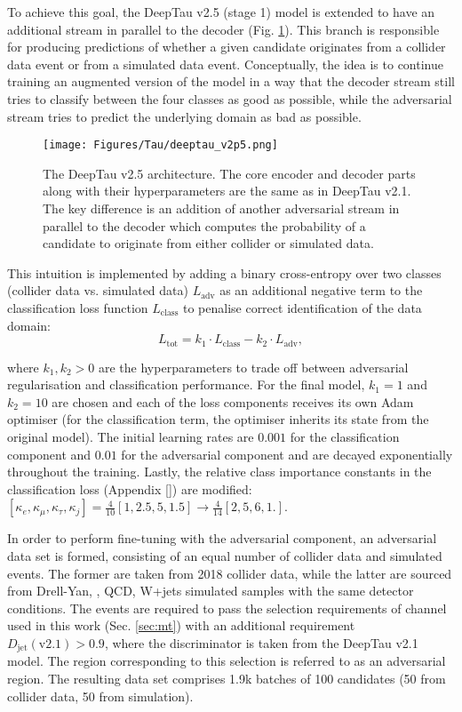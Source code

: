 To achieve this goal, the DeepTau v2.5 (stage 1) model is extended to have an additional stream in parallel to the decoder (Fig. \ref{fig:deeptau_v2p5_arch}). This branch is responsible for producing predictions of whether a given \tauh candidate originates from a collider data event or from a simulated data event. Conceptually, the idea is to continue training an augmented version of the model in a way that the decoder stream still tries to classify between the four classes as good as possible, while the adversarial stream tries to predict the underlying \tauh domain as bad as possible. 

\begin{figure}[!t]
    \centering
    \texttt{[image: Figures/Tau/deeptau\_v2p5.png]}
    \caption{The DeepTau v2.5 architecture. The core encoder and decoder parts along with their hyperparameters are the same as in DeepTau v2.1. The key difference is an addition of another adversarial stream in parallel to the decoder which computes the probability of a \tauh candidate to originate from either collider or simulated data.}
    \label{fig:deeptau_v2p5_arch}
\end{figure}

This intuition is implemented by adding a binary cross-entropy over two classes (collider data vs. simulated data) $L_\text{adv}$ as an additional negative term to the classification loss function $L_\text{class}$ to penalise correct identification of the data domain:
\begin{equation}
    L_\text{tot} = k_1 \cdot L_\text{class} - k_2 \cdot L_\text{adv},
\end{equation}\label{eq:adv_loss}

where $k_1, k_2 > 0$ are the hyperparameters to trade off between adversarial regularisation and classification performance. For the final model, $k_1=1$ and $k_2=10$ are chosen and each of the loss components receives its own Adam optimiser (for the classification term, the optimiser inherits its state from the original model). The initial learning rates are $0.001$ for the classification component and $0.01$ for the adversarial component and are decayed exponentially throughout the training. Lastly, the relative class importance constants in the classification loss (Appendix \ref{}) are modified: $[\kappa_e, \kappa_\mu, \kappa_\tau, \kappa_j] = \frac{4}{10}[1, 2.5, 5, 1.5] \to \frac{4}{14}[2, 5, 6, 1.]$.  

In order to perform fine-tuning with the adversarial component, an adversarial data set is formed, consisting of an equal number of collider data and simulated events. The former are taken from 2018 collider data, while the latter are sourced from Drell-Yan, \ttbar, QCD, W+jets simulated samples with the same detector conditions. The events are required to pass the selection requirements of \mt channel used in this work (Sec. \ref{sec:mt}) with an additional requirement $D_\text{jet}(\text{v2.1}) > 0.9$, where the discriminator is taken from the DeepTau v2.1 model. The region corresponding to this selection is referred to as an adversarial region. The resulting data set comprises 1.9k batches of 100 \tauh candidates (50 from collider data, 50 from simulation).

